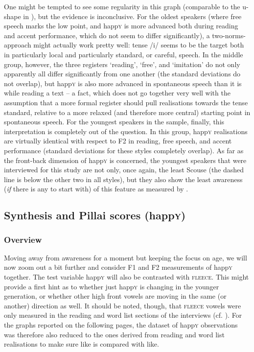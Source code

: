 One might be tempted to see some regularity in this graph (comparable to the u-shape in ), but the evidence is inconclusive.
For the oldest speakers (where free speech marks the low point, and happ\textsc{y} is more advanced both during reading and accent performance, which do not seem to differ significantly), a two-norms-approach might actually work pretty well: tense /i/ seems to be the target both in particularly local and particularly standard, or careful, speech.
In the middle group, however, the three registers `reading', `free', and `imitation' do not only apparently all differ significantly from one another (the standard deviations do not overlap), but happ\textsc{y} is also more advanced in spontaneous speech than it is while reading a text -- a fact, which does not go together very well with the assumption that a more formal register should pull realisations towards the tense standard, relative to a more relaxed (and therefore more central) starting point in spontaneous speech.
For the youngest speakers in the sample, finally, this interpretation is completely out of the question.
In this group, happ\textsc{y} realisations are virtually identical with respect to F2 in reading, free speech, and accent performance (standard deviations for these styles completely overlap).
As far as the front-back dimension of happ\textsc{y} is concerned, the youngest speakers that were interviewed for this study are not only, once again, the least Scouse (the dashed line is below the other two in all styles), but they also show the least awareness (\emph{if} there is any to start with) of this feature as measured by .

\subsection{Synthesis and Pillai scores (happ\textsc{y})}
\label{sec.prod.res.vow.happy.pil}

\subsubsection{Overview}

Moving away from awareness for a moment but keeping the focus on age, we will now zoom out a bit further and consider F1 and F2 measurements of happ\textsc{y} together.
The test variable happ\textsc{y} will also be contrasted with \textsc{fleece}.
This might provide a first hint as to whether just happ\textsc{y} is changing in the younger generation, or whether other high front vowels are moving in the same (or another) direction as well.
It should be noted, though, that \textsc{fleece} vowels were only measured in the reading and word list sections of the interviews (cf. ).
For the graphs reported on the following pages, the dataset of happ\textsc{y} observations was therefore also reduced to the ones derived from reading and word list realisations to make sure like is compared with like.

